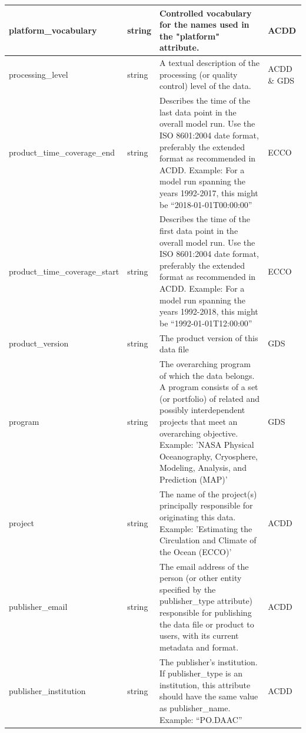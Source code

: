 \begin{longtable}{|p{}|p{}|p{}|p{}|}
\rowcolor{cyan!25} 
platform\_vocabulary & string & Controlled vocabulary for the names used in the "platform" attribute. & ACDD \\ \hline

\rowcolor{cyan!25} 
processing\_level & string & A textual description of the processing (or quality control) level of the data. & ACDD \& GDS \\ \hline

\rowcolor{cyan!25} 
product\_time\_coverage\_end & string & Describes the time of the last data point in the overall model run. Use the ISO 8601:2004 date format, preferably the extended format as recommended in ACDD.  Example: For a model run spanning the years 1992-2017, this might be “2018-01-01T00:00:00” & ECCO \\ \hline

\rowcolor{cyan!25} 
product\_time\_coverage\_start & string & Describes the time of the first data point in the overall model run. Use the ISO 8601:2004 date format, preferably the extended format as recommended in ACDD.  Example: For a model run spanning the years 1992-2018, this might be “1992-01-01T12:00:00” & ECCO \\ \hline

\rowcolor{cyan!25} 
product\_version & string & The product version of this data file & GDS \\ \hline

\rowcolor{cyan!25} 
program & string & The overarching program of which the data belongs. A program consists of a set (or portfolio) of related and possibly interdependent projects that meet an overarching objective.  Example: 'NASA Physical Oceanography, Cryosphere, Modeling, Analysis, and Prediction (MAP)' & GDS \\ \hline

\rowcolor{cyan!25} 
project & string & The name of the project(s) principally responsible for originating this data.  Example: 'Estimating the Circulation and Climate of the Ocean (ECCO)' & ACDD \\ \hline

\rowcolor{cyan!25} 
publisher\_email & string & The email address of the person (or other entity specified by the publisher\_type attribute) responsible for publishing the data file or product to users, with its current metadata and format. & ACDD \\ \hline

\rowcolor{cyan!25} 
publisher\_institution & string & The publisher’s institution. If publisher\_type is an institution, this attribute should have the same value as publisher\_name.  Example: “PO.DAAC” & ACDD \\ \hline


\end{longtable}

